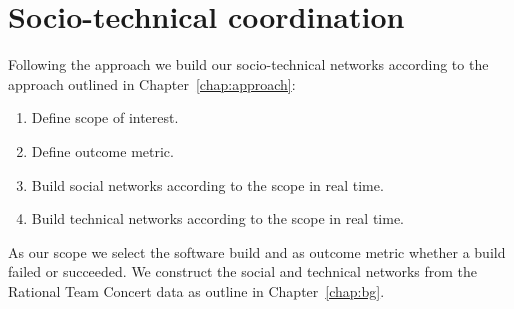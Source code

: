 \section{Socio-technical coordination}
\label{sec:data}
Following the approach we build our socio-technical networks according to the approach outlined in Chapter~\ref{chap:approach}:

\begin{enumerate}
\item Define scope of interest.
\item Define outcome metric.
\item Build social networks according to the scope in real time.
\item Build technical networks according to the scope in real time.
\end{enumerate}

As our scope we select the software build and as outcome metric whether a build failed or succeeded.
We construct the social and technical networks from the Rational Team Concert data as outline in Chapter~\ref{chap:bg}.


